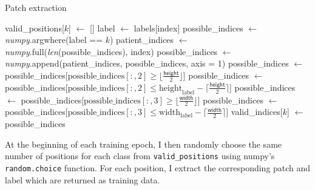 \documentclass[12pt,a4paper,twoside,openright]{report}
\begin{document}
\begin{algorithm}
\caption{Patch extraction}\label{alg:patch_extraction}
\begin{algorithmic}[1]
	\State valid\_positions[$k$] $\gets$ []
		\State label $\gets$ labels[index] 
		\State possible\_indices $\gets$ \textit{numpy}.argwhere(label == $k$)
		\State patient\_indices $\gets$ \textit{numpy}.full(\textit{len}(possible\_indices), index)
		\State possible\_indices $\gets$ \textit{numpy}.append(patient\_indices, possible\_indices, axis = 1)
		\State
		\State possible\_indices $\gets$ possible\_indices[$\text{possible\_indices}[:,2] \ge \lfloor \frac{\textsf{height}}{2} \rfloor$]
		\State possible\_indices $\gets$ possible\_indices[$\text{possible\_indices}[:,2] \leq \text{height}_{\text{label}} - \lceil \frac{\textsf{height}}{2} \rceil$]
		\State possible\_indices $\gets$ possible\_indices[$\text{possible\_indices}[:,3] \ge \lfloor \frac{\textsf{width}}{2} \rfloor$]
		\State possible\_indices $\gets$ possible\_indices[$\text{possible\_indices}[:,3]  \leq  \text{width}_{\text{label}} - \lceil \frac{\textsf{width}}{2} \rceil$]
		\State
		\State valid\_indices[$k$] $\gets$ possible\_indices
	\EndFor
\EndFor
\end{algorithmic}
\end{algorithm}

At the beginning of each training epoch, I then randomly choose the same number of positions for each class from \texttt{valid\_positions} using numpy's \texttt{random.choice} function. For each position, I extract the corresponding patch and label which are returned as training data.
\end{document}
